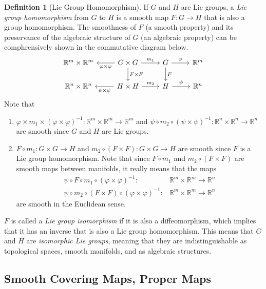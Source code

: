\documentclass{article}
\theoremstyle{remark}
\theoremstyle{definition}
\newtheorem{definition}{Definition}[section]
\begin{document}
\begin{definition}[Lie Group Homomorphism]
If $G$ and $H$ are Lie groups, a \textit{Lie group homomorphism} from $G$ to $H$ is a smooth map $F: G \longrightarrow H$ that is also a group homomorphism. 
The smoothness of $F$ (a smooth property) and its preservance of the algebraic structure of $G$ (an algebraic property) can be comphrensively shown in the commutative diagram below.
\[
  \begin{tikzcd}
    \mathbb{R}^m \times \mathbb{R}^m & G \times G \arrow{l}{\varphi \times \varphi} \arrow{r}{m_1} \arrow{d}{F \times F} & G \arrow{r}{\varphi} \arrow{d}{F} & \mathbb{R}^m \\
    \mathbb{R}^n \times \mathbb{R}^n & H \times H \arrow{l}{\psi \times \psi} \arrow{r}{m_2} & H \arrow{r}{\psi} & \mathbb{R}^n
  \end{tikzcd}
\]
Note that
\begin{enumerate}
    \item $\varphi \times m_1 \times (\varphi \times \varphi)^{-1} : \mathbb{R}^m \times \mathbb{R}^m \longrightarrow \mathbb{R}^m$ and $\psi \circ m_2 \circ (\psi \times \psi)^{-1}: \mathbb{R}^n \times \mathbb{R}^n \longrightarrow \mathbb{R}^n$ are smooth since $G$ and $H$ are Lie groups. 
    \item $F \circ m_1: G \times G \longrightarrow H$ and $m_2 \circ (F \times F): G \times G \longrightarrow H$ are smooth since $F$ is a Lie group homomorphism. Note that since $F \circ m_1$ and $m_2 \circ (F \times F)$ are smooth maps between manifolds, it really means that the maps 
    \begin{align*}
        \psi \circ F \circ m_1 \circ (\varphi \times \varphi)^{-1}: &\mathbb{R}^m \times \mathbb{R}^m \longrightarrow \mathbb{R}^n \\
        \psi \circ m_2 \circ (F \times F) \circ (\varphi \times \varphi)^{-1}: &\mathbb{R}^m \times \mathbb{R}^m \longrightarrow \mathbb{R}^n
    \end{align*}
    are smooth in the Euclidean sense. 
\end{enumerate}
$F$ is called a \textit{Lie group isomorphism} if it is also a diffeomorphism, which implies that it has an inverse that is also a Lie group homomorphism. This means that $G$ and $H$ are \textit{isomorphic Lie groups}, meaning that they are indistinguishable as topological spaces, smooth manifolds, and as algebraic structures. 
\end{definition}

\subsection{Smooth Covering Maps, Proper Maps}
\end{document}
